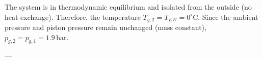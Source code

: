 The system is in thermodynamic equilibrium and isolated from the outside (no heat exchange). Therefore, the temperature \( T_{g,2} = T_{EW} = 0^\circ \text{C} \). Since the ambient pressure and piston pressure remain unchanged (mass constant), \( p_{g,2} = p_{g,1} = 1.9 \, \text{bar} \).  

---